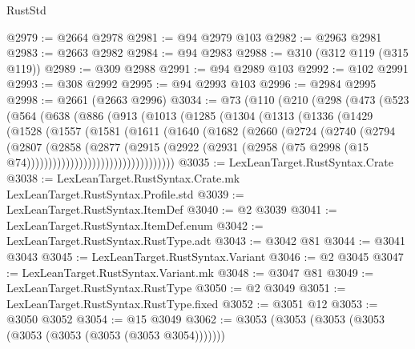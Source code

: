 \begin{lexlean}{RustStd}
\begin{coremodule}
{\begin{coremodule}
{{{{{{{{{{{{{{{{{{{{{{{{{{{{{{{{{{{{{@2979 := @2664 @2978
@2981 := @94 @2979 @103
@2982 := @2963 @2981
@2983 := @2663 @2982
@2984 := @94 @2983
@2988 := @310 (@312 @119 (@315 @119))
@2989 := @309 @2988
@2991 := @94 @2989 @103
@2992 := @102 @2991
@2993 := @308 @2992
@2995 := @94 @2993 @103
@2996 := @2984 @2995
@2998 := @2661 (@2663 @2996)
@3034 := @73
    (@110
      (@210
        (@298
          (@473
            (@523
              (@564
                (@638
                  (@886
                    (@913
                      (@1013
                        (@1285
                          (@1304
                            (@1313
                              (@1336
                                (@1429
                                  (@1528
                                    (@1557
                                      (@1581
                                        (@1611
                                          (@1640
                                            (@1682
                                              (@2660
                                                (@2724
                                                  (@2740
                                                    (@2794
                                                      (@2807
                                                        (@2858
                                                          (@2877
                                                            (@2915
                                                              (@2922
                                                                (@2931
                                                                  (@2958
                                                                    (@75
                                                                      @2998
                                                                      (@15
                                                                        @74))))))))))))))))))))))))))))))))))
@3035 := LexLeanTarget.RustSyntax.Crate
@3038 := LexLeanTarget.RustSyntax.Crate.mk LexLeanTarget.RustSyntax.Profile.std
@3039 := LexLeanTarget.RustSyntax.ItemDef
@3040 := @2 @3039
@3041 := LexLeanTarget.RustSyntax.ItemDef.enum
@3042 := LexLeanTarget.RustSyntax.RustType.adt
@3043 := @3042 @81
@3044 := @3041 @3043
@3045 := LexLeanTarget.RustSyntax.Variant
@3046 := @2 @3045
@3047 := LexLeanTarget.RustSyntax.Variant.mk
@3048 := @3047 @81
@3049 := LexLeanTarget.RustSyntax.RustType
@3050 := @2 @3049
@3051 := LexLeanTarget.RustSyntax.RustType.fixed
@3052 := @3051 @12
@3053 := @3050 @3052
@3054 := @15 @3049
@3062 := @3053 (@3053 (@3053 (@3053 (@3053 (@3053 (@3053 (@3053 @3054)))))))
}}}}}}}}}}}}}}}}}}}}}}}}}}}}}}}}}}}}}
\end{coremodule}}
\end{coremodule}
\end{lexlean}
